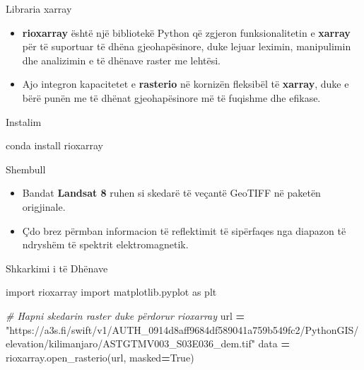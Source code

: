 \documentclass[
  ignorenonframetext,
]{beamer}
\newenvironment{Shaded}{\begin{snugshade}}{\end{snugshade}}
\newcommand{\CommentTok}[1]{\textcolor[rgb]{0.56,0.35,0.01}{\textit{#1}}}
\newcommand{\ImportTok}[1]{#1}
\newcommand{\NormalTok}[1]{#1}
\newcommand{\OperatorTok}[1]{\textcolor[rgb]{0.81,0.36,0.00}{\textbf{#1}}}
\newcommand{\StringTok}[1]{\textcolor[rgb]{0.31,0.60,0.02}{#1}}
\newcommand{\VariableTok}[1]{\textcolor[rgb]{0.00,0.00,0.00}{#1}}
\begin{document}
\begin{frame}{Libraria xarray}
\protect\hypertarget{libraria-xarray-1}{}
\begin{itemize}
\item
  \textbf{rioxarray} është një bibliotekë Python që zgjeron
  funksionalitetin e \textbf{xarray} për të suportuar të dhëna
  gjeohapësinore, duke lejuar leximin, manipulimin dhe analizimin e të
  dhënave raster me lehtësi.
\item
  Ajo integron kapacitetet e \textbf{rasterio} në kornizën fleksibël të
  \textbf{xarray}, duke e bërë punën me të dhënat gjeohapësinore më të
  fuqishme dhe efikase.
\end{itemize}
\end{frame}

\begin{frame}[fragile]{Instalim}
\protect\hypertarget{instalim}{}
\begin{Shaded}
\begin{Highlighting}[]
\NormalTok{conda install rioxarray}
\end{Highlighting}
\end{Shaded}
\end{frame}

\begin{frame}{Shembull}
\protect\hypertarget{shembull}{}
\begin{itemize}
\item
  Bandat \textbf{Landsat 8} ruhen si skedarë të veçantë GeoTIFF në
  paketën origjinale.
\item
  Çdo brez përmban informacion të reflektimit të sipërfaqes nga diapazon
  të ndryshëm të spektrit elektromagnetik.
\end{itemize}
\end{frame}

\begin{frame}[fragile]{Shkarkimi i të Dhënave}
\protect\hypertarget{shkarkimi-i-tuxeb-dhuxebnave}{}

\begin{Shaded}
\begin{Highlighting}[]
\ImportTok{import}\NormalTok{ rioxarray}
\ImportTok{import}\NormalTok{ matplotlib.pyplot }\ImportTok{as}\NormalTok{ plt}

\CommentTok{\# Hapni skedarin raster duke përdorur rioxarray}
\NormalTok{url }\OperatorTok{=} \StringTok{"https://a3s.fi/swift/v1/AUTH\_0914d8aff9684df589041a759b549fc2/PythonGIS/elevation/kilimanjaro/ASTGTMV003\_S03E036\_dem.tif"}
\NormalTok{data }\OperatorTok{=}\NormalTok{ rioxarray.open\_rasterio(url, masked}\OperatorTok{=}\VariableTok{True}\NormalTok{)}
\end{Highlighting}
\end{Shaded}
\end{frame}
\end{document}
